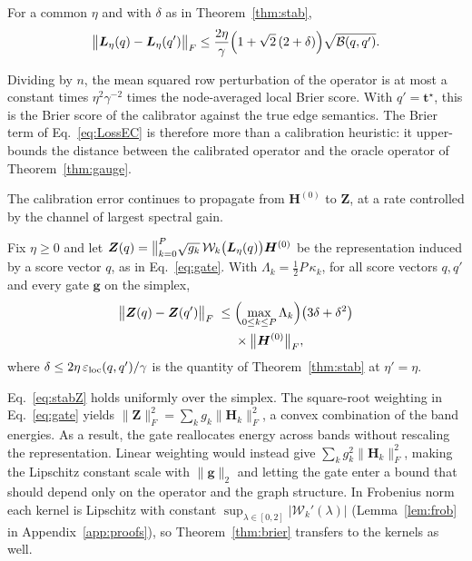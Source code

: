 \begin{theorem}\label{thm:brier}
For a common $\eta$ and with $\delta$ as in Theorem~\ref{thm:stab},
\[
\bigl\|\bm L_\eta(q)-\bm L_\eta(q')\bigr\|_F\le\frac{2\eta}{\gamma}\Bigl(1+\sqrt2\,(2+\delta)\Bigr)\sqrt{\mathcal B(q,q')}.
\]
\end{theorem}

Dividing by $n$, the mean squared row perturbation of the operator is at most a constant times $\eta^2\gamma^{-2}$ times the node-averaged local Brier score.
With $q'=\bm t^\star$, this is the Brier score of the calibrator against the true edge semantics.
The Brier term of Eq.~\eqref{eq:LossEC} is therefore more than a calibration heuristic: it upper-bounds the distance between the calibrated operator and the oracle operator of Theorem~\ref{thm:gauge}.

The calibration error continues to propagate from $\bm H^{(0)}$ to $\bm Z$, at a rate controlled by the channel of largest spectral gain.

\begin{theorem}\label{thm:repr}
Fix $\eta\ge0$ and let $\bm Z(q)=\big\Vert_{k=0}^{P}\sqrt{g_k}\,\mathcal{W}_k\bigl(\bm L_\eta(q)\bigr)\bm H^{(0)}$ be the representation induced by a score vector $q$, as in Eq.~\eqref{eq:gate}.
With $\Lambda_k=\tfrac12P\,\kappa_k$, for all score vectors $q,q'$ and every gate $\bm g$ on the simplex,
\begin{equation}
\begin{aligned}
\bigl\|\bm Z(q)-\bm Z(q')\bigr\|_F
\;\le\;&\Bigl(\max_{0\le k\le P}\Lambda_k\Bigr)\bigl(3\delta+\delta^2\bigr)\\
&\times\bigl\|\bm H^{(0)}\bigr\|_F,
\end{aligned}
\label{eq:stabZ}
\end{equation}
where $\delta\le2\eta\,\varepsilon_{\mathrm{loc}}(q,q')/\gamma$ is the quantity of Theorem~\ref{thm:stab} at $\eta'=\eta$.
\end{theorem}

\noindent Eq.~\eqref{eq:stabZ} holds uniformly over the simplex.
The square-root weighting in Eq.~\eqref{eq:gate} yields $\|\bm Z\|_F^2=\sum_k g_k\|\bm H_k\|_F^2$, a convex combination of the band energies.
As a result, the gate reallocates energy across bands without rescaling the representation.
Linear weighting would instead give $\sum_k g_k^2\|\bm H_k\|_F^2$, making the Lipschitz constant scale with $\|\bm g\|_2$ and letting the gate enter a bound that should depend only on the operator and the graph structure.
In Frobenius norm each kernel is Lipschitz with constant $\sup_{\lambda\in[0,2]}|\mathcal W_k'(\lambda)|$ (Lemma~\ref{lem:frob} in Appendix~\ref{app:proofs}), so Theorem~\ref{thm:brier} transfers to the kernels as well.

